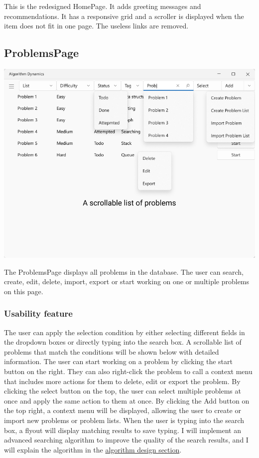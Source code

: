 \documentclass[a4paper]{report}
\begin{document}
This is the redesigned HomePage. It adds greeting messages and recommendations. It has a responsive grid and a scroller is displayed when the item does not fit in one page. The useless links are removed.

\subsection{ProblemsPage}

\includegraphics[width=\textwidth, height=\textheight, keepaspectratio]{ProblemsPage-design}

The ProblemsPage displays all problems in the database. The user can search, create, edit, delete, import, export or start working on one or multiple problems on this page.

\subsubsection{Usability feature}

The user can apply the selection condition by either selecting different fields in the dropdown boxes or directly typing into the search box. A scrollable list of problems that match the conditions will be shown below with detailed information. The user can start working on a problem by clicking the start button on the right. They can also right-click the problem to call a context menu that includes more actions for them to delete, edit or export the problem. By clicking the select button on the top, the user can select multiple problems at once and apply the same action to them at once. By clicking the Add button on the top right, a context menu will be displayed, allowing the user to create or import new problems or problem lists. When the user is typing into the search box, a flyout will display matching results to save typing. I will implement an advanced searching algorithm to improve the quality of the search results, and I will explain the algorithm in the \hyperref[sec:algorithm design]{algorithm design section}.
\end{document}
